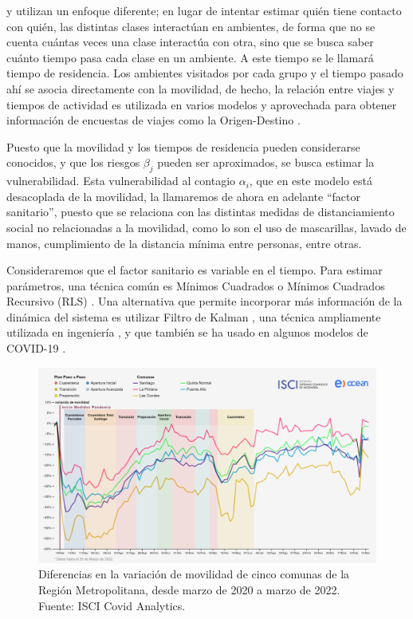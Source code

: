 \begin{intro}
\cite{Bichara2015} y \cite{Bichara2018} utilizan un enfoque diferente; en lugar de intentar estimar quién tiene contacto con quién, las distintas clases interactúan en ambientes, de forma que no se cuenta cuántas veces una clase interactúa con otra, sino que se busca saber cuánto tiempo pasa cada clase en un ambiente. A este tiempo se le llamará tiempo de residencia. Los ambientes visitados por cada grupo y el tiempo pasado ahí se asocia directamente con la movilidad, de hecho, la relación entre viajes y tiempos de actividad es utilizada en varios modelos \cite{Kitamura1988}\cite{Axhausen1992} y aprovechada para obtener información de encuestas de viajes como la Origen-Destino \cite{Munizaga2011}. 

Puesto que la movilidad y los tiempos de residencia pueden considerarse conocidos, y que los riesgos \(\beta_j\) pueden ser aproximados, se busca estimar la vulnerabilidad. Esta vulnerabilidad al contagio \(\alpha_i\), que en este modelo está desacoplada de la movilidad, la llamaremos de ahora en adelante ``factor sanitario'', puesto que se relaciona con las distintas medidas de distanciamiento social no relacionadas a la movilidad, como lo son el uso de mascarillas, lavado de manos, cumplimiento de la distancia mínima entre personas, entre otras.

Consideraremos que el factor sanitario es variable en el tiempo. Para estimar parámetros, una técnica común es Mínimos Cuadrados o Mínimos Cuadrados Recursivo (RLS) \cite{Sameni2020}\cite{Piccolomini2020}. Una alternativa que permite incorporar más información de la dinámica del sistema es utilizar Filtro de Kalman \cite{Kalman1960}, una técnica ampliamente utilizada en ingeniería \cite{Auger2013}, y que también se ha usado en algunos modelos de COVID-19 \cite{Hasan2020}\cite{Song2021}\cite{Sameni2020}.

\begin{figure}[h]
\centering
\includegraphics[width=\textwidth]{img/metodologia/datos/movilidad-RM.png}
\caption[Diferencias en la variación de movilidad de cinco comunas de la Región Metropolitana.]{Diferencias en la variación de movilidad de cinco comunas de la Región Metropolitana, desde marzo de 2020 a marzo de 2022. Fuente: ISCI Covid Analytics.}
\label{img:ISCI-movilidad-RM-1}
\end{figure}


\end{intro}
